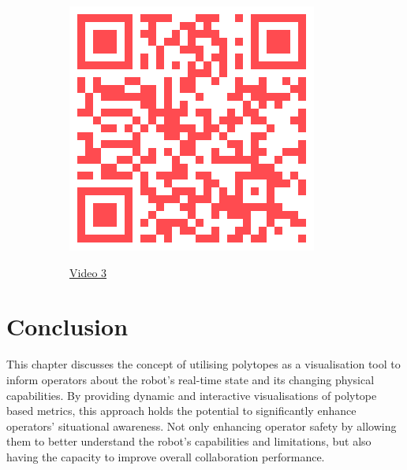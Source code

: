 \begin{figure}[!h]
\begin{subfigure}[b]{0.2\linewidth}
     \end{subfigure}
     \hfill
     \begin{subfigure}[b]{0.2\linewidth}
         \centering
         \href{https://youtu.be/jTJCCn27dPk}{\includegraphics[width=\textwidth]{qrcodes/icra2021.png}}\par \href{https://youtu.be/jTJCCn27dPk}{Video 3}
     \end{subfigure}
\end{figure}

\section{Conclusion}


This chapter discusses the concept of utilising polytopes as a visualisation tool to inform operators about the robot's real-time state and its changing physical capabilities. By providing dynamic and interactive visualisations of polytope based metrics, this approach holds the potential to significantly enhance operators' situational awareness. Not only enhancing operator safety by allowing them to better understand the robot's capabilities and limitations, but also having the capacity to improve overall collaboration performance. 



